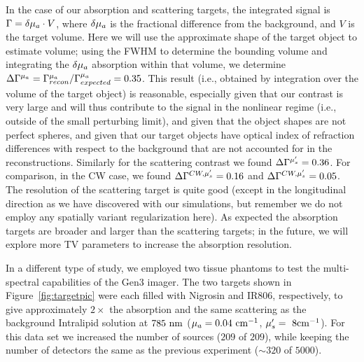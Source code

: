 In the case of our absorption and scattering targets, the integrated signal is $\Gamma =\delta \mu_a\cdot V$, where $\delta\mu_a$ is the fractional difference from the background, and $V$ is the target volume. Here we will use the approximate shape of the target object to estimate volume; using the FWHM to determine the bounding volume and integrating the $\delta\mu_a$ absorption within that volume, we determine $\Delta\Gamma^{\mu_a}=\Gamma_{recon}^{\mu_a}/\Gamma_{expected}^{\mu_a}=0.35$. This result (i.e., obtained by integration over the volume of the target object) is reasonable, especially given that our contrast is very large and will thus contribute to the signal in the nonlinear regime (i.e., outside of the small perturbing limit), and given that the object shapes are not perfect spheres, and given that our target objects have optical index of refraction differences with respect to the background that are not accounted for in the reconstructions. Similarly for the scattering contrast we found $\Delta\Gamma^{\mu_s^{\prime}}=0.36$. For comparison, in the CW case, we found $\Delta\Gamma^{CW,\mu_s^{\prime}}=0.16$ and $\Delta\Gamma^{CW,\mu_s^{\prime}}=0.05$. The resolution of the scattering target is quite good (except in the longitudinal direction as we have discovered with our simulations, but remember we do not employ any spatially variant regularization here). As expected the absorption targets are broader and larger than the scattering targets; in the future, we will explore more TV parameters to increase the absorption resolution.

In a different type of study, we employed two tissue phantoms to test the multi-spectral capabilities of the Gen3 imager. The two targets shown in Figure~\ref{fig:targetpic} were each filled with Nigrosin and IR806, respectively, to give approximately $2\times$ the absorption and the same scattering as the background Intralipid solution at $785~\rm{nm}$ ($\mu_a=0.04~\rm{cm}^{-1}$, $\mu_s^{\prime}=~8\rm{cm}^{-1}$). For this data set we increased the number of sources ($209$ of $209$), while keeping the number of detectors the same as the previous experiment ($\sim320$ of $5000$).

